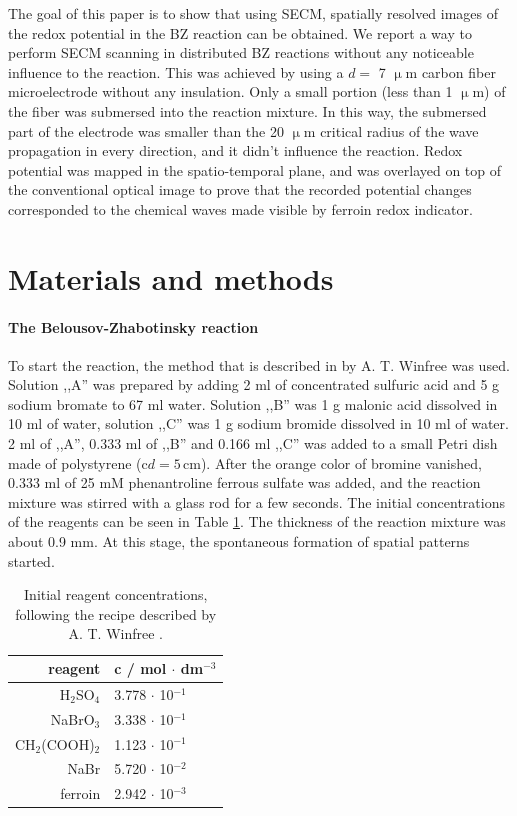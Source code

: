 \documentclass[3p]{elsarticle}
\begin{document}
The goal of this paper is to show that using SECM, spatially resolved images of the redox potential in the BZ reaction can be obtained.
We report a way to perform SECM scanning in distributed BZ reactions without any noticeable influence to the reaction.
This was achieved by using a $d=$ 7 $\upmu$m carbon fiber microelectrode without any insulation.
Only a small portion (less than 1 $\upmu$m) of the fiber was submersed into the reaction mixture.
In this way, the submersed part of the electrode was smaller than the 20 $\upmu$m critical radius of the wave propagation \cite{foerster1989critical} in every direction, and it didn't influence the reaction.
Redox potential was mapped in the spatio-temporal plane, and was overlayed on top of the conventional optical image to prove that the recorded potential changes corresponded to the chemical waves made visible by ferroin redox indicator.

\section{Materials and methods}
\paragraph{The Belousov-Zhabotinsky reaction} To start the reaction, the method that is described in \cite{winfree2001geometry} by A. T. Winfree was used.
Solution ,,A'' was prepared by adding 2 ml of concentrated sulfuric acid and 5 g sodium bromate to 67 ml water.
Solution ,,B'' was 1 g malonic acid dissolved in 10 ml of water, solution ,,C'' was 1 g sodium bromide dissolved in 10 ml of water.
2 ml of ,,A'', 0.333 ml of ,,B'' and 0.166 ml ,,C'' was added to a small Petri dish made of polystyrene (c$d=5 \,$cm).
After the orange color of bromine vanished, 0.333 ml of 25 mM phenantroline ferrous sulfate was added, and the reaction mixture was stirred with a glass rod for a few seconds.
The initial concentrations of the reagents can be seen in Table \ref{table:initial}.
The thickness of the reaction mixture was about 0.9 mm.
At this stage, the spontaneous formation of spatial patterns started.

\begin{table}[]
\caption{Initial reagent concentrations, following the recipe described by A. T. Winfree  \cite{winfree2001geometry}.}
\centering
\begin{tabular}{rl}
reagent    & c / mol $\cdot$ dm$^{-3}$ \\ \hline
H$_2$SO$_4$      & 3.778 $\cdot$ 10$^{-1}$   \\
NaBrO$_3$     & 3.338 $\cdot$ 10$^{-1}$   \\
CH$_2$(COOH)$_2$ & 1.123 $\cdot$ 10$^{-1}$   \\
NaBr       & 5.720 $\cdot$ 10$^{-2}$    \\
ferroin    & 2.942 $\cdot$ 10$^{-3}$  
\end{tabular}
\label{table:initial}
\end{table}
\end{document}
